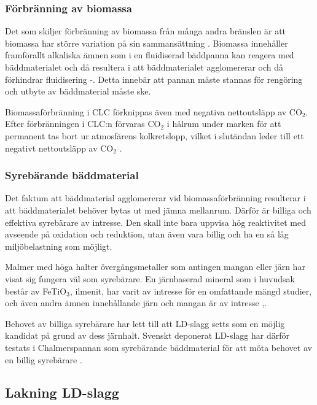 \subsubsection{Förbränning av biomassa}
Det som skiljer förbränning av biomassa från många andra bränslen är att biomassa har större variation på sin sammansättning \cite{Ashcomp}. Biomassa innehåller framförallt alkaliska ämnen som i en fluidiserad bäddpanna kan reagera med bäddmaterialet och då resultera i att bäddmaterialet agglomererar och då förhindrar fluidisering \cite{Alkali}-\cite{glas}. Detta innebär att pannan måste stannas för rengöring och utbyte av bäddmaterial måste ske.

Biomassaförbränning i CLC förknippas även med negativa nettoutsläpp av CO$_2$. Efter förbränningen i CLC:n förvaras CO$_2$ i hålrum under marken för att permanent tas bort ur atmosfärens kolkretslopp, vilket i slutändan leder till ett negativt nettoutsläpp av CO$_2$ \cite{Bui2018}.
%

\subsubsection{Syrebärande bäddmaterial}
Det faktum att bäddmaterial agglomererar vid biomassaförbränning resulterar i att bäddmaterialet behöver bytas ut med jämna mellanrum. Därför är billiga och effektiva syrebärare av intresse.  
Den skall inte bara uppvisa hög reaktivitet med avseende på oxidation och reduktion, utan även vara billig och ha en så låg miljöbelastning som möjligt. 

Malmer med höga halter övergångsmetaller som antingen mangan eller järn har visat sig fungera väl som syrebärare.
En järnbaserad mineral som i huvudsak består av FeTiO$_3$, ilmenit,  har varit av intresse för en omfattande mängd studier, och även andra ämnen innehållande järn och mangan är av intresse \cite{OresHenrik},\cite{Xu2017}.

Behovet av billiga syrebärare har lett till att LD-slagg setts som en möjlig kandidat på grund av dess järnhalt. Svenskt deponerat LD-slagg har därför testats i Chalmerspannan som syrebärande bäddmaterial för att möta behovet av en billig syrebärare \cite{chalmerspanna}.


\subsection{Lakning LD-slagg}


